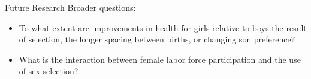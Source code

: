 \documentclass[final]{beamer}
\begin{document}
\begin{frame}{}
\begin{columns}[t]
\begin{column}{.3\linewidth}
\begin{block}{Future Research}
Broader questions:
\begin{itemize}
\item To what extent are improvements in health for girls
relative to boys the result of selection, the longer spacing between
births, or changing son preference?
\item What is the interaction between female labor force participation
and the use of sex selection?
\end{itemize}

\end{block}




\end{column}


\end{columns}

\end{frame}
\end{document}
